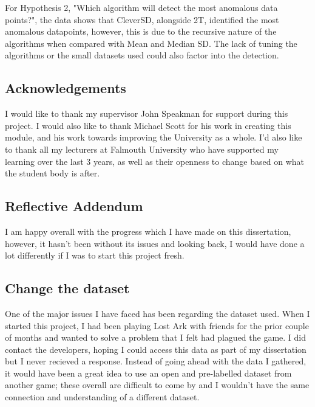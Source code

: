\documentclass[journal]{IEEEtran}
\begin{document}
For Hypothesis 2, "Which algorithm will detect the most anomalous data points?", the data shows that CleverSD, alongside 2T, identified the most anomalous datapoints, however, this is due to the recursive nature of the algorithms when compared with Mean and Median SD. The lack of tuning the algorithms or the small datasets used could also factor into the detection.

\printbibliography
\begin{appendices}
    \begin{appendices}
        \section{Acknowledgements}
        \label{appendix:aknowledgements}
        I would like to thank my supervisor John Speakman for support during this project. I would also like to thank Michael Scott for his work in creating this module, and his work towards improving the University as a whole. I'd also like to thank all my lecturers at Falmouth University who have supported my learning over the last 3 years, as well as their openness to change based on what the student body is after.
    \end{appendices}

    \begin{appendices}
        \section{Reflective Addendum}
        \label{appendix:reflection}
        I am happy overall with the progress which I have made on this dissertation, however, it hasn't been without its issues and looking back, I would have done a lot differently if I was to start this project fresh.

        \subsection{Change the dataset}
        One of the major issues I have faced has been regarding the dataset used. When I started this project, I had been playing Lost Ark with friends for the prior couple of months and wanted to solve a problem that I felt had plagued the game. I did contact the developers, hoping I could access this data as part of my dissertation but I never recieved a response. Instead of going ahead with the data I gathered, it would have been a great idea to use an open and pre-labelled dataset from another game; these overall are difficult to come by and I wouldn't have the same connection and understanding of a different dataset.


\end{appendices}
\end{appendices}
\end{document}
